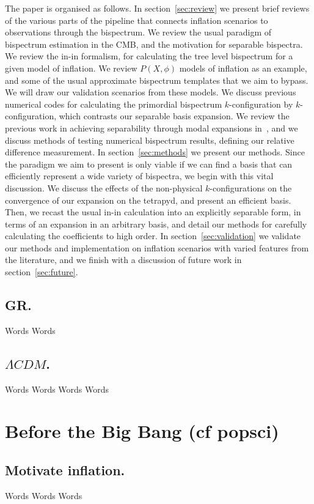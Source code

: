 The paper is organised as follows. In section~\ref{sec:review} we present brief reviews
of the various parts of the pipeline that connects inflation scenarios to observations
through the bispectrum.
We review the usual paradigm of bispectrum estimation in the CMB,
and the motivation for separable bispectra. We review the in-in formalism,
for calculating the tree level bispectrum for a given model of inflation.
We review $P(X,\phi)$ models of inflation as an example, and
some of the usual approximate bispectrum templates
that we aim to bypass.
We will draw our validation scenarios from these models.
We discuss previous numerical codes for
calculating the primordial bispectrum $k$-configuration by $k$-configuration,
which contrasts our separable basis expansion.
We review the previous work in achieving separability through modal expansions
in~\cite{Funakoshi},
and we discuss methods of testing
numerical bispectrum results, defining our relative difference measurement.
In section~\ref{sec:methods} we present our methods.
Since the paradigm we aim to present is only viable if we can find a basis
that can efficiently represent a wide variety of bispectra,
we begin with this vital discussion. We discuss the effects of the
non-physical $k$-configurations on the convergence of our expansion on
the tetrapyd, and present an efficient basis.
Then, we recast the usual in-in calculation into an explicitly separable form,
in terms of an expansion in an arbitrary basis,
and detail our methods for carefully calculating the coefficients to high order.
In section~\ref{sec:validation} we validate our methods and implementation
on inflation scenarios with varied features from the literature,
and we finish with a discussion of future work in section~\ref{sec:future}.
    \subsection{GR.}
    Words
\newpage
    Words
\newpage
    \subsection{$\Lambda CDM$.}
    Words
\newpage
    Words
\newpage
    Words
\newpage
    Words
\newpage
\section{Before the Big Bang (cf popsci)}
    \subsection{Motivate inflation.}
    Words
\newpage
    Words
\newpage
    Words
\newpage
